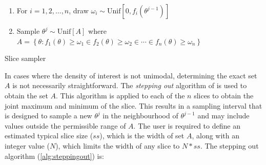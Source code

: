 \documentclass[article]{jss}
\begin{document}
%
\begin{algorithm}[H]
\begin{enumerate}
\item For $i=1,2,\dots,n$, draw $\omega_{i}\sim\mbox{Unif}[0,f_{i}(\theta^{j-1})]$ 
\item Sample $\theta^{j}\sim\mbox{Unif}[A]$ where $A=\left\{ \theta:f_{1}(\theta)\ge\omega_{1}\in f_{2}(\theta)\ge\omega_{2}\in\cdots\in f_{n}(\theta)\ge\omega_{n}\right\} $ 
\end{enumerate}
\caption{Slice sampler}
\label{alg:slicesamp}
\end{algorithm}


In cases where the density of interest is not unimodal, determining
the exact set $A$ is not necessarily straightforward. The
\emph{stepping out} algorithm of \citet{Radford2003} is used to obtain
the set $A$.  This algorithm is applied to each of the $n$ slices to
obtain the joint maximum and minimum of the slice. This results in a
sampling interval that is designed to sample a new $\theta^{j}$ in the
neighbourhood of $\theta^{j-1}$ and may include values outside the
permissible range of $A$. The user is required to define an estimated
typical slice size ($ss$), which is the width of set $A$, along with
an integer value ($N$), which limits the width of any slice to $N*ss$.
The stepping out algorithm (\ref{alg:steppingout}) is:
\end{document}
